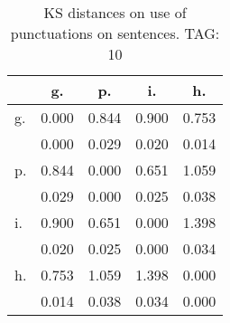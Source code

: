 \begin{table}[h!]
\begin{center}
\begin{tabular}{| l | c | c | c | c |}\hline
 & g. & p. & i. & h. \\\hline
g. & 0.000  & 0.844  & 0.900  & 0.753 \\\hline
 & 0.000  & 0.029  & 0.020  & 0.014 \\\hline
p. & 0.844  & 0.000  & 0.651  & 1.059 \\\hline
 & 0.029  & 0.000  & 0.025  & 0.038 \\\hline
i. & 0.900  & 0.651  & 0.000  & 1.398 \\\hline
 & 0.020  & 0.025  & 0.000  & 0.034 \\\hline
h. & 0.753  & 1.059  & 1.398  & 0.000 \\\hline
 & 0.014  & 0.038  & 0.034  & 0.000 \\\hline
\end{tabular}
\caption{KS distances on use of punctuations on sentences. TAG: 10}
\end{center}
\end{table}